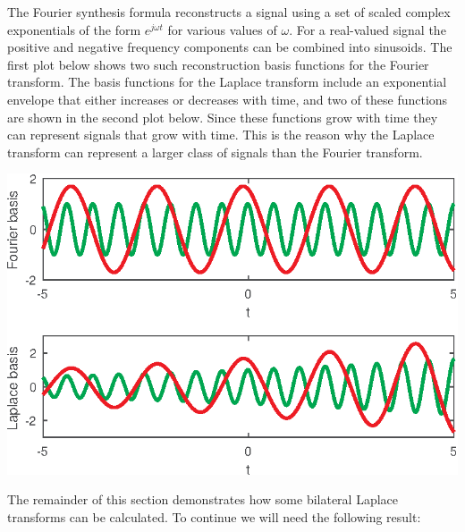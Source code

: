 \documentclass[10pt]{beamer}
\begin{document}
The Fourier synthesis formula reconstructs a signal using a set of scaled complex exponentials of the form $e^{j \omega t}$ for various values of $\omega$.  For a real-valued signal the positive and negative frequency components can be combined into sinusoids.  The first plot below shows two such reconstruction basis functions for the Fourier transform.  The basis functions for the Laplace transform include an exponential envelope that either increases or decreases with time, and two of these functions are shown in the second plot below.  Since these functions grow with time they can represent signals that grow with time.  This is the reason why the Laplace transform can represent a larger class of signals than the Fourier transform.\begin{center}
  \includegraphics{laplacerecbasis}
\end{center}

The remainder of this section demonstrates how some bilateral Laplace transforms can be calculated.  To continue we will need the following result:
\begin{center}
\end{center}
\end{document}
